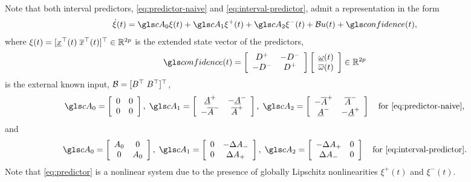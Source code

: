 Note that both interval predictors, \eqref{eq:predictor-naive} and
\eqref{eq:interval-predictor}, admit a representation in the form
\begin{equation}
\dot{\xi}(t)=\cA_{0}\xi(t)+\cA_{1}\xi^{+}(t)+\cA_{2}\xi^{-}(t)+\cB u(t)+\confidence(t),\label{eq:predictor}
\end{equation}
where $\xi(t)=[\underline{x}^{\top}(t)\;\overline{x}^{\top}(t)]^{\top}\in\mathbb{R}^{2p}$
is the extended state vector of the predictors,
\[
\confidence(t)=\left[\begin{array}{cc}
D^{+} & -D^{-}\\
-D^{-} & D^{+}
\end{array}\right]\left[\begin{array}{c}
\underline{\omega}(t)\\
\overline{\omega}(t)
\end{array}\right]\in\Real^{2p}
\]
is the external known input, $\mathcal{B}=[B^{\top}\;B^{\top}]^{\top}$, 
\[
\cA_{0}=\left[\begin{array}{cc}
0 & 0\\
0 & 0
\end{array}\right],\;\cA_{1}=\left[\begin{array}{cc}
\underline{A}^{+} & -\underline{A}^{-}\\
-\overline{A}^{-} & \overline{A}^{+}
\end{array}\right],\;\cA_{2}=\left[\begin{array}{cc}
-\overline{A}^{+} & \overline{A}^{-}\\
\underline{A}^{-} & -\underline{A}^{+}
\end{array}\right]
\quad \text{for \eqref{eq:predictor-naive},}
\]
 and
\[
\cA_{0}=\left[\begin{array}{cc}
A_{0} & 0\\
0 & A_{0}
\end{array}\right],\;\cA_{1}=\left[\begin{array}{cc}
0 & -\Delta A_{-}\\
0 & \Delta A_{+}
\end{array}\right],\;\cA_{2}=\left[\begin{array}{cc}
-\Delta A_{+} & 0\\
\Delta A_{-} & 0
\end{array}\right]
\quad \text{for \eqref{eq:interval-predictor}.}
\]
Note that \eqref{eq:predictor} is a nonlinear system due to the presence of globally Lipschitz nonlinearities $\xi^{+}(t)$ and $\xi^{-}(t)$. 

